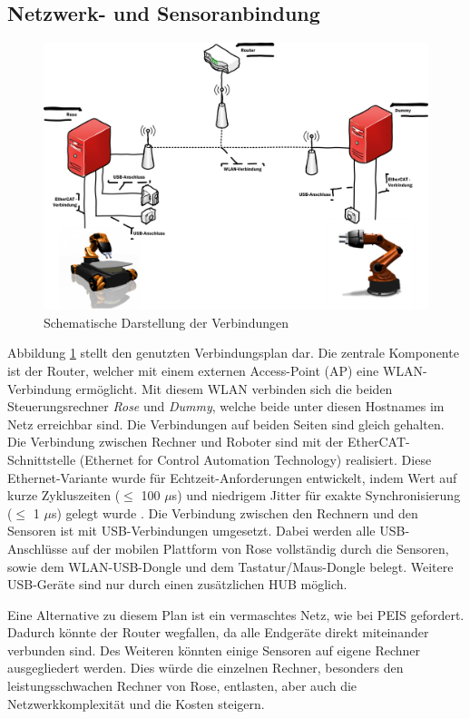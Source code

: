 \subsection{Netzwerk- und Sensoranbindung}

\begin{figure}
	\centering
	\includegraphics[scale=0.5]{fig/netw}   
	\caption[Schematische Darstellung der Verbindungen]{Schematische Darstellung der Verbindungen}
	\label{fig:aufbau-netw}
\end{figure}

Abbildung \ref{fig:aufbau-netw} stellt den genutzten Verbindungsplan dar. Die zentrale Komponente ist der Router, welcher mit einem externen Access-Point (AP) eine WLAN-Verbindung ermöglicht. Mit diesem WLAN verbinden sich die beiden Steuerungsrechner \textit{Rose} und \textit{Dummy}, welche beide unter diesen Hostnames im Netz erreichbar sind. Die Verbindungen auf beiden Seiten sind gleich gehalten. Die Verbindung zwischen Rechner und Roboter sind mit der EtherCAT-Schnittstelle (Ethernet for Control Automation Technology) realisiert. Diese Ethernet-Variante wurde für Echtzeit-Anforderungen entwickelt, indem Wert auf kurze Zykluszeiten ($\leq$ 100 $\mu$s) und  niedrigem Jitter für exakte Synchronisierung ($\leq$ 1 $\mu$s) gelegt wurde \citep{ethercat}.  Die Verbindung zwischen den Rechnern und den Sensoren ist mit USB-Verbindungen umgesetzt. Dabei werden alle USB-Anschlüsse auf der mobilen Plattform von Rose vollständig durch die Sensoren, sowie dem WLAN-USB-Dongle und dem Tastatur/Maus-Dongle belegt. Weitere USB-Geräte sind nur durch einen zusätzlichen HUB möglich. 

Eine Alternative zu diesem Plan ist ein vermaschtes Netz, wie bei PEIS gefordert. Dadurch könnte der Router wegfallen, da alle Endgeräte direkt miteinander verbunden sind. Des Weiteren könnten einige Sensoren auf eigene Rechner ausgegliedert werden. Dies würde die einzelnen Rechner, besonders den leistungsschwachen Rechner von Rose, entlasten, aber auch die Netzwerkkomplexität und die Kosten steigern.

